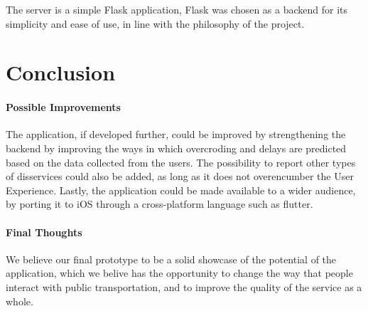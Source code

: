 \documentclass[a4paper, 11pt]{report}
\begin{document}
The server is a simple Flask application, Flask was chosen
as a backend for its simplicity and ease of use, in line
with the philosophy of the project.


\section{Conclusion}\label{sec:conclusion}


\paragraph{Possible Improvements}

The application, if developed further, could be improved
by strengthening the backend by improving the ways in
which overcroding and delays are predicted based
on the data collected from the users. The possibility
to report other types of disservices could also be
added, as long as it does not overencumber the
User Experience. Lastly, the application could be
made available to a wider audience, by porting it
to iOS through a cross-platform language such as flutter.

\paragraph{Final Thoughts}
We believe our final prototype to be a solid showcase of
the potential of the application, which we belive has
the opportunity to change the way that people interact
with public transportation, and to improve the quality
of the service as a whole.
\end{document}
